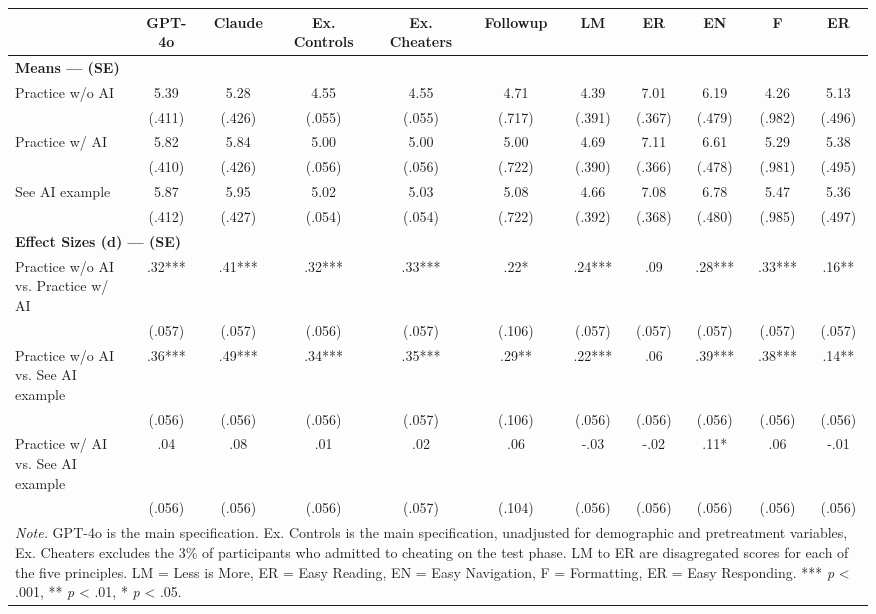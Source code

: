\documentclass[11pt]{report}
\begin{document}
\begin{append}
\begin{landscape}
\begin{table}[h]
\begin{tabular}{lcccccccccc}
\toprule
  & GPT-4o & Claude & Ex. Controls & Ex. Cheaters & Followup & LM & ER & EN & F & ER \\ 
\midrule
\multicolumn{11}{l}{\textbf{Means --- (SE)}} \\ 
\midrule
Practice w/o AI & 5.39 & 5.28 & 4.55 & 4.55 & 4.71 & 4.39 & 7.01 & 6.19 & 4.26 & 5.13 \\ 
 & (.411) & (.426) & (.055) & (.055) & (.717) & (.391) & (.367) & (.479) & (.982) & (.496) \\ 
Practice w/ AI & 5.82 & 5.84 & 5.00 & 5.00 & 5.00 & 4.69 & 7.11 & 6.61 & 5.29 & 5.38 \\ 
 & (.410) & (.426) & (.056) & (.056) & (.722) & (.390) & (.366) & (.478) & (.981) & (.495) \\ 
See AI example & 5.87 & 5.95 & 5.02 & 5.03 & 5.08 & 4.66 & 7.08 & 6.78 & 5.47 & 5.36 \\ 
 & (.412) & (.427) & (.054) & (.054) & (.722) & (.392) & (.368) & (.480) & (.985) & (.497) \\ 
\midrule
\multicolumn{11}{l}{\textbf{Effect Sizes (d) --- (SE)}} \\ 
\midrule
Practice w/o AI vs. Practice w/ AI & .32*** & .41*** & .32*** & .33*** & .22* & .24*** & .09 & .28*** & .33*** & .16** \\ 
 & (.057) & (.057) & (.056) & (.057) & (.106) & (.057) & (.057) & (.057) & (.057) & (.057) \\ 
Practice w/o AI vs. See AI example & .36*** & .49*** & .34*** & .35*** & .29** & .22*** & .06 & .39*** & .38*** & .14** \\ 
 & (.056) & (.056) & (.056) & (.057) & (.106) & (.056) & (.056) & (.056) & (.056) & (.056) \\ 
Practice w/ AI vs. See AI example & .04 & .08 & .01 & .02 & .06 & -.03 & -.02 & .11* & .06 & -.01 \\ 
 & (.056) & (.056) & (.056) & (.057) & (.104) & (.056) & (.056) & (.056) & (.056) & (.056) \\ 
\midrule
\multicolumn{11}{p{18cm}}{\textit{Note.} GPT-4o is the main specification. Ex. Controls is the main specification, unadjusted for demographic and pretreatment variables, Ex. Cheaters excludes the 3\% of participants who admitted to cheating on the test phase. LM to ER are disagregated scores for each of the five principles. LM = Less is More, ER = Easy Reading, EN = Easy Navigation, F = Formatting, ER = Easy Responding. *** \textit{p} < .001, ** \textit{p} < .01, * \textit{p} < .05.}
\vspace{5pt}\end{tabular}


\end{table}
\end{landscape}
\end{append}
\end{document}
